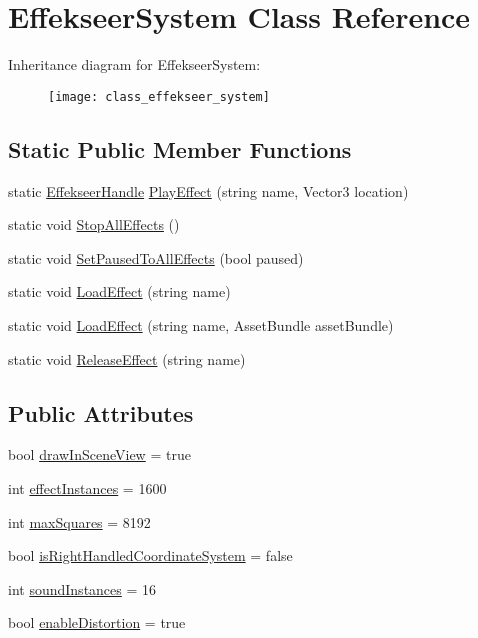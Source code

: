 \hypertarget{class_effekseer_system}{}\section{Effekseer\+System Class Reference}
\label{class_effekseer_system}
Inheritance diagram for Effekseer\+System\+:\begin{figure}[H]
\begin{center}
\leavevmode
\texttt{[image: class\_effekseer\_system]}
\end{center}
\end{figure}
\subsection*{Static Public Member Functions}
\begin{DoxyCompactItemize}
\item 
static \hyperlink{struct_effekseer_handle}{Effekseer\+Handle} \hyperlink{class_effekseer_system_a8d0a7561a512b64acce39c4456ff6f37}{Play\+Effect} (string name, Vector3 location)
\item 
static void \hyperlink{class_effekseer_system_acf3dde4a65c0e99aeacfea71b517b541}{Stop\+All\+Effects} ()
\item 
static void \hyperlink{class_effekseer_system_af4e9eb30bd4a06ff5bc32b6ef0d020fe}{Set\+Paused\+To\+All\+Effects} (bool paused)
\item 
static void \hyperlink{class_effekseer_system_af4059b796725905982565d8b239bf9fa}{Load\+Effect} (string name)
\item 
static void \hyperlink{class_effekseer_system_a4f7d874f76c4f354b70b852df590be72}{Load\+Effect} (string name, Asset\+Bundle asset\+Bundle)
\item 
static void \hyperlink{class_effekseer_system_a8b328c83692b922217657a21f9d5fdeb}{Release\+Effect} (string name)
\end{DoxyCompactItemize}
\subsection*{Public Attributes}
\begin{DoxyCompactItemize}
\item 
bool \hyperlink{class_effekseer_system_a469cf59d9deeaef6e27b15c5fc5ee524}{draw\+In\+Scene\+View} = true
\item 
int \hyperlink{class_effekseer_system_a0516609db2194d83016f439b93510f21}{effect\+Instances} = 1600
\item 
int \hyperlink{class_effekseer_system_a2007e297eab6bc504cce40650679b1c4}{max\+Squares} = 8192
\item 
bool \hyperlink{class_effekseer_system_a106a9e679535bdacd968ab94c421321e}{is\+Right\+Handled\+Coordinate\+System} = false
\item 
int \hyperlink{class_effekseer_system_ac83155c54d94fc6b61f6f53032923667}{sound\+Instances} = 16
\item 
bool \hyperlink{class_effekseer_system_ad8a639d37912d6a3ada4ba5a065a7493}{enable\+Distortion} = true
\end{DoxyCompactItemize}
